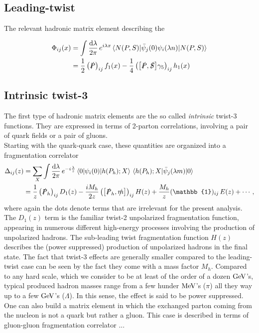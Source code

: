 \subsection{Leading-twist }
The relevant hadronic matrix element describing the 


\begin{equation}
    \begin{aligned}
        \Phi_{ij}(x)&= \int\frac{\dd \lambda}{2\pi} \,e^{i\lambda x}\mel{N(P,S)}{\bar \psi_j(0) \psi_i(\lambda n)}{N(P,S)}\\
        &= \frac{1}{2}\left(\slashed{P}\right)_{ij} f_1(x)
        -\frac{1}{4} \left(\comm{\slashed{P}}{\slashed{S}}\gamma_5\right)_{ij} h_1(x)
    \end{aligned}
\end{equation}
\subsection{Intrinsic twist-3}
The first type of hadronic matrix elements are the so called \textit{intrinsic} twist-3 functions. They are expressed in terms of 2-parton correlations, involving a pair of quark fields or a pair of gluons. \\
Starting with the quark-quark case, these quantities are organized into a fragmentation correlator
\begin{equation}
    \begin{aligned}
        \Delta_{ij}(z)&= \sum_X\int\frac{\dd \lambda}{2\pi} \,e^{-i\frac{\lambda}{z}}\mel{0}{\psi_i(0)}{h(P_h);X}\mel{h(P_h);X}{\bar \psi_j(\lambda m)}{0}\\
        &= \frac{1}{z}\left(\slashed{P}_h\right)_{ij} D_1(z)-\frac{iM_h}{2z} \left(\comm{\slashed{P}_h}{\slashed{m}}\right)_{ij} H(z)+\frac{M_h}{z}(\mathbb{1})_{ij}\,E(z)+\cdots,
        \end{aligned}
\end{equation}
where again the dots denote terms that are irrelevant for the present analysis. The $D_1(z)$ term is the familiar twist-2 unpolarized fragmentation function, appearing in numerous different high-energy processes involving the production of unpolarized hadrons. The sub-leading twist fragmentation function $H(z)$ describes the (power suppressed) production of unpolarized hadrons in the final state. The fact that twist-3 effects are generally smaller compared to the leading-twist case can be seen by the fact they come with a mass factor $M_h$. Compared to any hard scale, which we consider to be at least of the order of a dozen $\rm GeV$'s, typical produced hadron masses range from a few hunder $\rm MeV$'s ($\pi$) all they way up to a few $\rm GeV$'s ($\Lambda$). In this sense, the effect is said to be power suppressed.\\
One can also build a matrix element in which the exchanged parton coming from the nucleon is not a quark but rather a gluon. This case is described in terms of gluon-gluon fragmentation correlator ...


